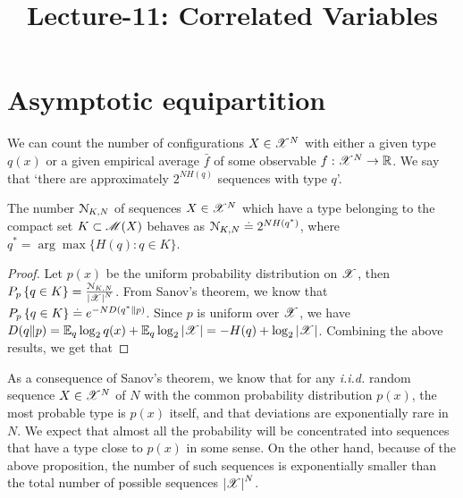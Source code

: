 \documentclass[letterpaper,english,10pt]{article}
\title{Lecture-11: Correlated Variables}
\begin{document}
\maketitle
\section{Asymptotic equipartition}
We can count the number of configurations $X  \in \mathscr{X}^N$ with either a given type $q(x)$ or a given empirical average  $\bar{f}$ of some observable $f: \mathscr{X}^N \to \mathbb{R}$. 
We say that `there are approximately $2^{NH(q)}$ sequences with type $q$'. 
\begin{prop}
 The number $\mathcal{N}_{K,N}$ of sequences $X \in \mathscr{X}^N$ which have a type belonging to the compact set $K \subset \mathscr{M}(X)$ behaves as $\mathcal{N}_{K,N} \stackrel{.}{=} 2^{NH(q^\ast)}$, where $q^\ast =\arg\max\{H(q): q \in  K\}$.
\end{prop}
\begin{proof} 
Let $p(x)$ be the uniform probability distribution on $\mathscr{X}$, then $P_p\left\{q \in K\right\} = \frac{\mathcal{N}_{K,N}}{\left\lvert\mathscr{X}\right\rvert^N}$. 
From Sanov's theorem, we know that $P_p\left\{q \in K\right\}  \stackrel{.}{=} e^{-N D(q^{\ast} \Vert p)}$. 
Since $p$ is uniform over $\mathscr{X}$, we have $D(q \Vert p) = \mathbb{E}_q\log_2 q(x) + \mathbb{E}_q\log_2\left\lvert\mathscr{X}\right\rvert = -H(q) + \log_2\left\lvert\mathscr{X}\right\rvert$. 
Combining the above results, we get that 
\end{proof}
As a consequence of Sanov's theorem, 
we know that for any \emph{i.i.d.} random sequence $X \in \mathscr{X}^N$ of $N$  with the common probability distribution $p(x)$, the most probable type is $p(x)$ itself, and that deviations are exponentially rare in $N$. 
We expect that almost all the probability will be concentrated into sequences that have a type close to $p(x)$ in some sense. 
On the other hand, because of the above proposition, the number of such sequences is exponentially smaller than the total number of possible sequences $\left\lvert\mathscr{X}\right\rvert^N$. 
\end{document}

